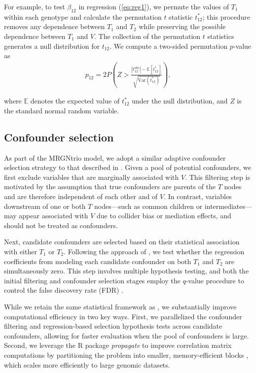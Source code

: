 \documentclass[12pt,letterpaper]{report}
\begin{document}
\begin{doublespace}
For example, to test $\beta_{12}$ in regression (\autoref{eq:reg1}), we permute the values of $T_1$ within each genotype and calculate the permutation $t$ statistic $t_{12}^*$; this procedure removes any dependence between $T_1$ and $T_2$ while preserving the possible dependence between $T_1$ and $V$.  The collection of the permutation $t$ statistics generates a null distribution for $t_{12}$.  We compute a two-sided permutation $p$-value as 
\begin{align}
	p_{12} = 2P\left( Z > \frac{|t_{12}^{obs}|-\mathbb{E}\left[t_{12}^*\right]}{\sqrt{\text{Var}\left(t_{12}^*\right)}}\right)\label{eq:perm_p} ,
\end{align}

\hspace{-9pt}where $\mathbb{E}$ denotes the expected value of $t_{12}^*$ under the null distribution, and $Z$ is the standard normal random variable.


\subsection{Confounder selection}
As part of the MRGNtrio model, we adopt a similar adaptive confounder selection strategy to that described in \cite{yang2017identifying}. Given a pool of potential confounders, we first exclude variables that are marginally associated with $V$. This filtering step is motivated by the assumption that true confounders are parents of the $T$ nodes and are therefore independent of each other and of $V$. In contrast, variables downstream of one or both $T$ nodes—such as common children or intermediates—may appear associated with $V$ due to collider bias or mediation effects, and should not be treated as confounders.

Next, candidate confounders are selected based on their statistical association with either $T_1$ or $T_2$. Following the approach of \cite{yang2017identifying}, we test whether the regression coefficients from modeling each candidate confounder on both $T_1$ and $T_2$ are simultaneously zero. This step involves multiple hypothesis testing, and both the initial filtering and confounder selection stages employ the $q$-value procedure to control the false discovery rate (FDR) \cite{storey2003positive}.

While we retain the same statistical framework as \cite{yang2017identifying}, we substantially improve computational efficiency in two key ways. First, we parallelized the confounder filtering and regression-based selection hypothesis tests across candidate confounders, allowing for faster evaluation when the pool of confounders is large. Second, we leverage the R package \textit{propagate} to improve correlation matrix computations by partitioning the problem into smaller, memory-efficient blocks \cite{spiess2018package}, which scales more efficiently to large genomic datasets.



\end{doublespace}
\end{document}
